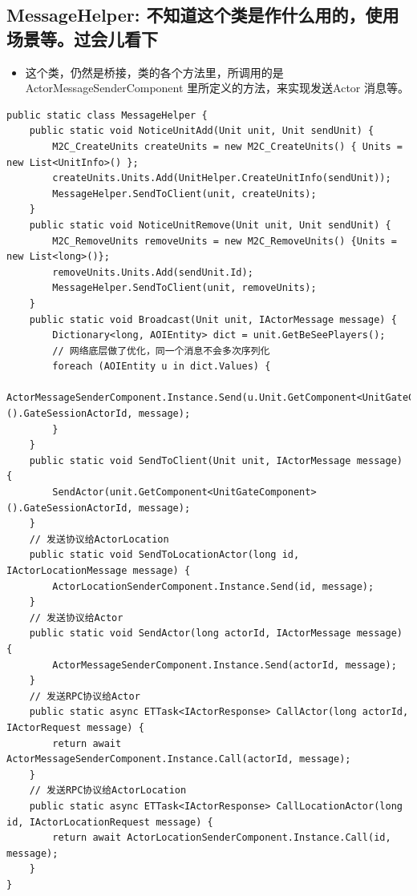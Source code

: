 \documentclass[9pt, b5paper]{article}
\begin{document}
\subsection{MessageHelper: 不知道这个类是作什么用的，使用场景等。过会儿看下}
\label{sec-8-16}
\begin{itemize}
\item 这个类，仍然是桥接，类的各个方法里，所调用的是ActorMessageSenderComponent 里所定义的方法，来实现发送Actor 消息等。
\end{itemize}
\begin{verbatim}
public static class MessageHelper {
    public static void NoticeUnitAdd(Unit unit, Unit sendUnit) {
        M2C_CreateUnits createUnits = new M2C_CreateUnits() { Units = new List<UnitInfo>() };
        createUnits.Units.Add(UnitHelper.CreateUnitInfo(sendUnit));
        MessageHelper.SendToClient(unit, createUnits);
    }
    public static void NoticeUnitRemove(Unit unit, Unit sendUnit) {
        M2C_RemoveUnits removeUnits = new M2C_RemoveUnits() {Units = new List<long>()};
        removeUnits.Units.Add(sendUnit.Id);
        MessageHelper.SendToClient(unit, removeUnits);
    }
    public static void Broadcast(Unit unit, IActorMessage message) {
        Dictionary<long, AOIEntity> dict = unit.GetBeSeePlayers();
        // 网络底层做了优化，同一个消息不会多次序列化
        foreach (AOIEntity u in dict.Values) {
            ActorMessageSenderComponent.Instance.Send(u.Unit.GetComponent<UnitGateComponent>().GateSessionActorId, message);
        }
    }
    public static void SendToClient(Unit unit, IActorMessage message) {
        SendActor(unit.GetComponent<UnitGateComponent>().GateSessionActorId, message);
    }
    // 发送协议给ActorLocation
    public static void SendToLocationActor(long id, IActorLocationMessage message) {
        ActorLocationSenderComponent.Instance.Send(id, message);
    }
    // 发送协议给Actor
    public static void SendActor(long actorId, IActorMessage message) {
        ActorMessageSenderComponent.Instance.Send(actorId, message);
    }
    // 发送RPC协议给Actor
    public static async ETTask<IActorResponse> CallActor(long actorId, IActorRequest message) {
        return await ActorMessageSenderComponent.Instance.Call(actorId, message);
    }
    // 发送RPC协议给ActorLocation
    public static async ETTask<IActorResponse> CallLocationActor(long id, IActorLocationRequest message) {
        return await ActorLocationSenderComponent.Instance.Call(id, message);
    }
}
\end{verbatim}
\end{document}
